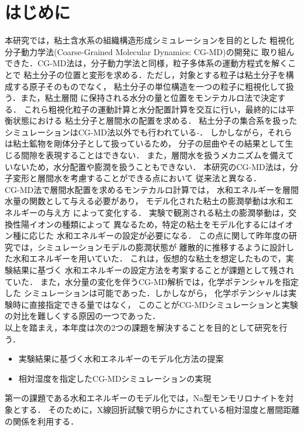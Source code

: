 \section{はじめに}
本研究では，粘土含水系の組織構造形成シミュレーションを目的とした
粗視化分子動力学法(Coarse-Grained Molecular Dynamics: CG-MD)の開発に
取り組んできた．CG-MD法は，分子動力学法と同様，粒子多体系の運動方程式を解くことで
粘土分子の位置と変形を求める．ただし，対象とする粒子は粘土分子を構成する原子そのものでなく，
粘土分子の単位構造を一つの粒子に粗視化して扱う．また，粘土層間
に保持される水分の量と位置をモンテカルロ法で決定する．
これら粗視化粒子の運動計算と水分配置計算を交互に行い，最終的には平衡状態における
粘土分子と層間水の配置を求める．
粘土分子の集合系を扱ったシミュレーションはCG-MD法以外でも行われている\cite{Eb2014}-\cite{Katti}．
しかしながら，それらは粘土鉱物を剛体分子として扱っているため，
分子の屈曲やその結果として生じる間隙を表現することはできない．
また，層間水を扱うメカニズムを備えていないため，水分配置や膨潤を扱うこともできない．
本研究のCG-MD法は，分子変形と層間水を考慮することができる点において
従来法と異なる．
\\
\hspace{\parindent}
CG-MD法で層間水配置を求めるモンテカルロ計算では，
水和エネルギーを層間水量の関数として与える必要があり，
モデル化された粘土の膨潤挙動は水和エネルギーの与え方
によって変化する．
実験で観測される粘土の膨潤挙動は，交換性陽イオンの種類によって
異なるため，特定の粘土をモデル化するにはイオン種に応じた
水和エネルギーの設定が必要になる．
この点に関して昨年度の研究では，シミュレーションモデルの膨潤状態が
離散的に推移するように設計した水和エネルギーを用いていた．
これは，仮想的な粘土を想定したもので，実験結果に基づく
水和エネルギーの設定方法を考案することが課題として残されていた．
また，水分量の変化を伴うCG-MD解析では，化学ポテンシャルを指定した
シミュレーションは可能であった．しかしながら，
化学ポテンシャルは実験時に直接指定できる量ではなく，
このことがCG-MDシミュレーションと実験の対比を難しくする原因の一つであった．\\
\hspace{\parindent}
以上を踏まえ，本年度は次の2つの課題を解決することを目的として研究を行う．
\begin{itemize}
\item
	実験結果に基づく水和エネルギーのモデル化方法の提案
\item
	相対湿度を指定したCG-MDシミュレーションの実現
\end{itemize}
第一の課題である水和エネルギーのモデル化では，Na型モンモリロナイトを対象とする．
そのために，X線回折試験で明らかにされている相対湿度と層間距離の関係を利用する．

